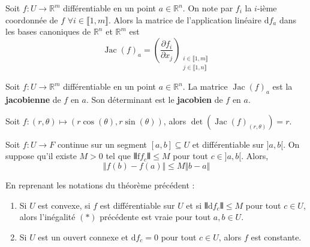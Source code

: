 
  \begin{corollary}
    Soit $f : U \rightarrow \mathbb{R}^m$ différentiable en un point $a \in \mathbb{R}^n$. On note par $f_i$ la $i$-ième coordonnée de $f$ $\forall i \in \llbracket 1, m \rrbracket$. Alors la matrice de l'application linéaire $\mathrm{d}f_a$ dans les bases canoniques de $\mathbb{R}^n$ et $\mathbb{R}^m$ est
    \[ \operatorname{Jac}(f)_a = \left( \frac{\partial f_i}{\partial x_j} \right)_{\substack{i \in \llbracket 1, m \rrbracket \\ j \in \llbracket 1, n \rrbracket}} \]
  \end{corollary}

  \begin{definition}
    Soit $f : U \rightarrow \mathbb{R}^m$ différentiable en un point $a \in \mathbb{R}^n$. La matrice $\operatorname{Jac}(f)_a$ est la \textbf{jacobienne} de $f$ en $a$. Son déterminant est le \textbf{jacobien} de $f$ en $a$.
  \end{definition}


  \begin{example}
    Soit $f : (r,\theta) \mapsto (r\cos(\theta), r\sin(\theta))$, alors $\det(\operatorname{Jac}(f)_{(r,\theta)}) = r$.
  \end{example}


  \begin{theorem}
    Soit $f : U \rightarrow F$ continue sur un segment $[a,b] \subseteq U$ et différentiable sur $]a,b[$. On suppose qu'il existe $M > 0$ tel que $\VERT \mathrm{f}f_c \VERT \leq M$ pour tout $c \in ]a,b[$. Alors,
    \[ \Vert f(b) - f(a) \Vert \leq M \Vert b - a \Vert \tag{$*$} \]
  \end{theorem}

  \begin{corollary}
    En reprenant les notations du théorème précédent :
    \begin{enumerate}[label=(\roman*)]
      \item Si $U$ est convexe, si $f$ est différentiable sur $U$ et si $\VERT \mathrm{d}f_c \VERT \leq M$ pour tout $c \in U$, alors l'inégalité $(*)$ précédente est vraie pour tout $a,b \in U$.
      \item Si $U$ est un ouvert connexe et $\mathrm{d}f_c = 0$ pour tout $c \in U$, alors $f$ est constante.
    \end{enumerate}
  \end{corollary}

